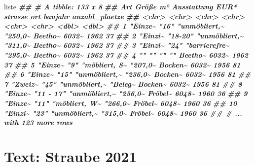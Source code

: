 \documentclass[
  ngerman,
]{article}
\newenvironment{Shaded}{\begin{snugshade}}{\end{snugshade}}
\newcommand{\DocumentationTok}[1]{\textcolor[rgb]{0.56,0.35,0.01}{\textbf{\textit{#1}}}}
\newcommand{\NormalTok}[1]{#1}
\begin{document}
\begin{Shaded}
\begin{Highlighting}[]
\NormalTok{liste}
\DocumentationTok{\#\# \# A tibble: 133 x 8}
\DocumentationTok{\#\#    Art     \textasciigrave{}Größe m²\textasciigrave{} Ausstattung   \textasciigrave{}EUR*\textasciigrave{}  strasse ort   baujahr anzahl\_plaetze}
\DocumentationTok{\#\#    \textless{}chr\textgreater{}   \textless{}chr\textgreater{}      \textless{}chr\textgreater{}         \textless{}chr\textgreater{}   \textless{}chr\textgreater{}   \textless{}chr\textgreater{}   \textless{}dbl\textgreater{}          \textless{}dbl\textgreater{}}
\DocumentationTok{\#\#  1 "Einze\textasciitilde{} "16"       "unmöbliert,\textasciitilde{} "250,0\textasciitilde{} Beetho\textasciitilde{} 6032\textasciitilde{}    1962             37}
\DocumentationTok{\#\#  2 "Einzi\textasciitilde{} "18{-}20"    "unmöbliert,\textasciitilde{} "311,0\textasciitilde{} Beetho\textasciitilde{} 6032\textasciitilde{}    1962             37}
\DocumentationTok{\#\#  3 "Einzi\textasciitilde{} "24"       "barrierefre\textasciitilde{} "295,0\textasciitilde{} Beetho\textasciitilde{} 6032\textasciitilde{}    1962             37}
\DocumentationTok{\#\#  4 ""      ""         ""            ""      Beetho\textasciitilde{} 6032\textasciitilde{}    1962             37}
\DocumentationTok{\#\#  5 "Einze\textasciitilde{} "9"        "möbliert, S\textasciitilde{} "207,0\textasciitilde{} Bocken\textasciitilde{} 6032\textasciitilde{}    1956             81}
\DocumentationTok{\#\#  6 "Einze\textasciitilde{} "15"       "unmöbliert,\textasciitilde{} "236,0\textasciitilde{} Bocken\textasciitilde{} 6032\textasciitilde{}    1956             81}
\DocumentationTok{\#\#  7 "Zweiz\textasciitilde{} "45"       "unmöbliert,\textasciitilde{} "Beleg\textasciitilde{} Bocken\textasciitilde{} 6032\textasciitilde{}    1956             81}
\DocumentationTok{\#\#  8 "Einze\textasciitilde{} "11 {-} 17"  "unmöbliert,\textasciitilde{} "256,0\textasciitilde{} Fröbel\textasciitilde{} 6048\textasciitilde{}    1960             36}
\DocumentationTok{\#\#  9 "Einze\textasciitilde{} "11"       "möbliert, W\textasciitilde{} "266,0\textasciitilde{} Fröbel\textasciitilde{} 6048\textasciitilde{}    1960             36}
\DocumentationTok{\#\# 10 "Einzi\textasciitilde{} "23"       "unmöbliert,\textasciitilde{} "315,0\textasciitilde{} Fröbel\textasciitilde{} 6048\textasciitilde{}    1960             36}
\DocumentationTok{\#\# \# ... with 123 more rows}
\end{Highlighting}
\end{Shaded}

\hypertarget{text-straube-2021}{%
\section{Text: Straube 2021}\label{text-straube-2021}}
\end{document}
